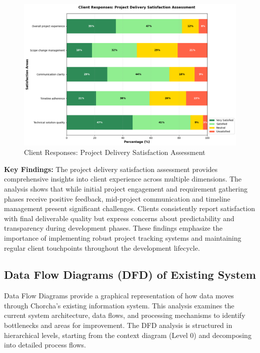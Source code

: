 \documentclass[12pt,a4paper,oneside]{book}
\begin{document}






\newpage

\begin{figure}[H]
    \centering
    \includegraphics[width=1.0\textwidth]{download.png} %
    \caption{Client Responses: Project Delivery Satisfaction Assessment}
    \label{fig:client_satisfaction}
\end{figure}

\textbf{Key Findings:} The project delivery satisfaction assessment provides comprehensive insights into client experience across multiple dimensions. The analysis shows that while initial project engagement and requirement gathering phases receive positive feedback, mid-project communication and timeline management present significant challenges. Clients consistently report satisfaction with final deliverable quality but express concerns about predictability and transparency during development phases. These findings emphasize the importance of implementing robust project tracking systems and maintaining regular client touchpoints throughout the development lifecycle.
\newpage
\subsection{Data Flow Diagrams (DFD) of Existing System}

Data Flow Diagrams provide a graphical representation of how data moves through Chorcha's existing information system. This analysis examines the current system architecture, data flows, and processing mechanisms to identify bottlenecks and areas for improvement. The DFD analysis is structured in hierarchical levels, starting from the context diagram (Level 0) and decomposing into detailed process flows.
\end{document}
